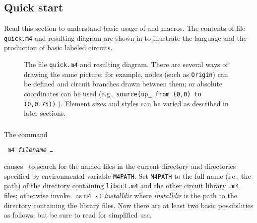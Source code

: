 \subsection{Quick start\label{Quickstart:}}
Read this section to understand basic usage of \Mfour and macros.
The contents of file {\tt quick.m4} and resulting diagram are shown in
 to illustrate the language
and the production of basic labeled circuits.
\begin{figure}[ht]
   \parbox{\textwidth}{\small}%
   \hfill\llap{\raise-1.15in\hbox{ }}%
   \vspace*{-\baselineskip}%
   \caption{The file {\tt quick.m4} and resulting diagram.
     There are several ways of drawing the same picture; for example,
      nodes (such as {\tt Origin}) can be defined and circuit branches
      drawn between them; or absolute coordinates can be used (e.g.,
      {\tt source(up\_ from (0,0) to (0,0.75))} ).  Element sizes and styles
      can be varied as described in later sections.\label{quick}}%
   \end{figure}

\subsubsection{%
\label{Usingmfour:}}
The command

  {\vspace*\parsep\tt
    m4 {\sl filename \ldots}
   \vspace*\parsep}

\noindent
causes \Mfour\ to search for the named
files in the current directory and directories specified
by environmental variable {\tt M4PATH}. 
Set {\tt M4PATH} to the full name (i.e., the path) of the directory containing
{\tt libcct.m4} and the other circuit library {\tt .m4} files; otherwise
invoke \Mfour\ as {\tt m4 -I} {\sl installdir} 
where {\sl installdir} is the path to the directory
containing the library files.
Now there are at least two basic possibilities as follows,
but be sure to read  for simplified use.

